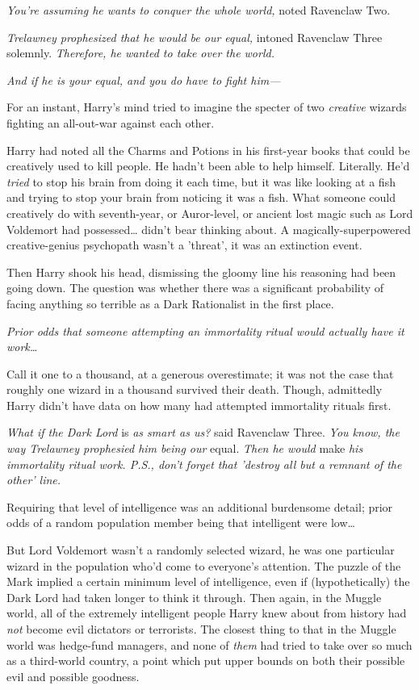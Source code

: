 \emph{You're assuming he wants to conquer the whole world,} noted Ravenclaw Two.

\emph{Trelawney prophesized that he would be our equal,} intoned Ravenclaw 
Three solemnly. \emph{Therefore, he wanted to take over the world.}

\emph{And if he is your equal, and you do have to fight him---}

For an instant, Harry's mind tried to imagine the specter of two 
\emph{creative} wizards fighting an all-out-war against each other.

Harry had noted all the Charms and Potions in his first-year books that could 
be creatively used to kill people. He hadn't been able to help himself. 
Literally. He'd \emph{tried} to stop his brain from doing it each time, but it 
was like looking at a fish and trying to stop your brain from noticing it was a 
fish. What someone could creatively do with seventh-year, or Auror-level, or 
ancient lost magic such as Lord Voldemort had possessed{\ldots} didn't bear 
thinking about. A magically-superpowered creative-genius psychopath wasn't a 
'threat', it was an extinction event.

Then Harry shook his head, dismissing the gloomy line his reasoning had been 
going down. The question was whether there was a significant probability of 
facing anything so terrible as a Dark Rationalist in the first place.

\emph{Prior odds that someone attempting an immortality ritual would actually 
have it work{\ldots}}

Call it one to a thousand, at a generous overestimate; it was not the case that 
roughly one wizard in a thousand survived their death. Though, admittedly Harry 
didn't have data on how many had attempted immortality rituals first.

\emph{What if the Dark Lord} is\emph{ as smart as us?} said Ravenclaw Three. 
\emph{You know, the way Trelawney prophesied him being our} equal.\emph{ Then 
he would} make\emph{ his immortality ritual work. P.S., don't forget that 
'destroy all but a remnant of the other' line.}

Requiring that level of intelligence was an additional burdensome detail; prior 
odds of a random population member being that intelligent were low{\ldots}

But Lord Voldemort wasn't a randomly selected wizard, he was one particular 
wizard in the population who'd come to everyone's attention. The puzzle of the 
Mark implied a certain minimum level of intelligence, even if (hypothetically) 
the Dark Lord had taken longer to think it through. Then again, in the Muggle 
world, all of the extremely intelligent people Harry knew about from history 
had \emph{not} become evil dictators or terrorists. The closest thing to that 
in the Muggle world was hedge-fund managers, and none of \emph{them} had tried 
to take over so much as a third-world country, a point which put upper bounds 
on both their possible evil and possible goodness.


